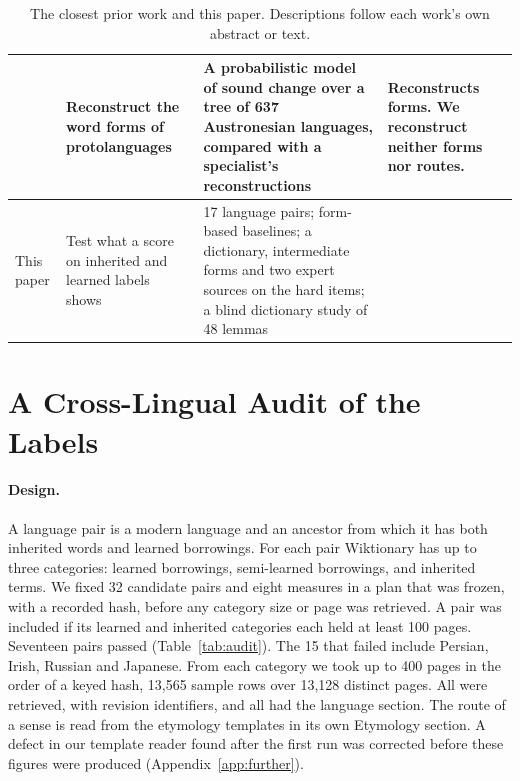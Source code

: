 \documentclass[11pt]{article}
\begin{document}
\begin{table}[t]
\begin{tabular}{p{}p{}p{}p{}}
\addlinespace
\citet{bouchardcote2013automated} & Reconstruct the word forms of protolanguages & A probabilistic model of sound change over a tree of 637 Austronesian languages, compared with a specialist's reconstructions & Reconstructs forms. We reconstruct neither forms nor routes. \\
\midrule
This paper & Test what a score on inherited and learned labels shows & 17 language pairs; form-based baselines; a dictionary, intermediate forms and two expert sources on the hard items; a blind dictionary study of 48 lemmas & \\
\bottomrule
\end{tabular}
\caption{The closest prior work and this paper. Descriptions follow each work's own abstract or text.}
\label{tab:prior}
\end{table}

\section{A Cross-Lingual Audit of the Labels}
\label{sec:audit}

\paragraph{Design.} A language pair is a modern language and an ancestor from which it has both inherited words and learned borrowings. For each pair Wiktionary has up to three categories: learned borrowings, semi-learned borrowings, and inherited terms. We fixed 32 candidate pairs and eight measures in a plan that was frozen, with a recorded hash, before any category size or page was retrieved. A pair was included if its learned and inherited categories each held at least 100 pages. Seventeen pairs passed (Table~\ref{tab:audit}). The 15 that failed include Persian, Irish, Russian and Japanese. From each category we took up to 400 pages in the order of a keyed hash, 13,565 sample rows over 13,128 distinct pages. All were retrieved, with revision identifiers, and all had the language section. The route of a sense is read from the etymology templates in its own Etymology section. A defect in our template reader found after the first run was corrected before these figures were produced (Appendix~\ref{app:further}).
\end{document}
